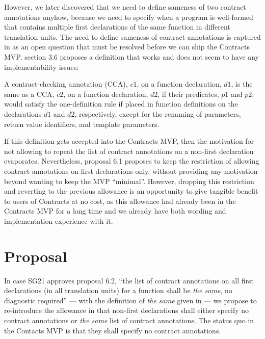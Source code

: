 However, we later discovered that we need to define sameness of two contract annotations anyhow, because we need to specify when a program is well-formed that contains multiple first declarations of the same function in different translation units. The need to define sameness of contract annotations is captured in \cite{P2896R0} as an open question that must be resolved before we can ship the Contracts MVP. \cite{P2932R2} section 3.6 proposes a definition that works and does not seem to have any implementability issues:

\begin{adjustwidth}{0.5cm}{0.5cm}
A contract-checking annotation (CCA), $c1$, on a function declaration, $d1$, is the same as a CCA, $c2$, on a function declaration,
$d2$, if their predicates, $p1$ and $p2$, would satisfy the one-definition rule if placed in function
definitions on the declarations $d1$ and $d2$, respectively, except for the renaming of parameters,
return value identifiers, and template parameters.
\end{adjustwidth}

If this definition gets accepted into the Contracts MVP, then the motivation for not allowing to repeat the list of contract annotations on a non-first declaration evaporates. Nevertheless, \cite{P2932R2} proposal 6.1 proposes to keep the restriction of allowing contract annotations on first declarations only, without providing any motivation beyond wanting to keep the MVP ``minimal''. However, dropping this restriction and reverting to the previous allowance is an opportunity to give tangible benefit to users of Contracts at no cost, as this allowance had already been in the Contracts MVP for a long time and we already have both wording and implementation experience with it.

\section{Proposal}

In case SG21 approves \cite{P2932R2} proposal 6.2, ``the list of contract annotations on all first declarations (in all translation units) for a function shall be \emph{the same}, no diagnostic required'' --- with the definition of \emph{the same} given in \cite{P2932R2} --- we propose to re-introduce the allowance in \cite{P2388R4} that non-first declarations shall either specify no contract annotations or \emph{the same} list of contract annotations. The status quo in the Contacts MVP is that they shall specify no contract annotations.

